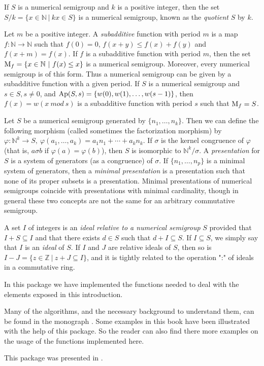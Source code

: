 \documentclass[a4paper,11pt]{report}
\begin{document}
{ If $S$ is a numerical semigroup and $k$ is a positive integer, then the set $S/k=\{ x\in {\mathbb N} \ |\ kx\in S\}$ is a numerical semigroup, known as the \emph{quotient} $S$ by $k$. 

 Let $m$ be a positive integer. A \label{llab2}\emph{subadditive} function with period $m$ is a map $f:{\mathbb N}\to {\mathbb N}$ such that $ f(0)=0$, $f(x+y)\leq f(x)+f(y)$ and $f(x+m)=f(x)$. If $f$ is a subadditive function with period $m$, then the set ${\rm M}_f=\{ x\in {\mathbb N}\ |\ f(x)\leq x\}$ is a numerical semigroup. Moreover, every numerical semigroup is of this form.
Thus a numerical semigroup can be given by a subadditive function with a given
period. If $S$ is a numerical semigroup and $s\in S, s\not=0$, and ${\rm Ap}(S,s)=\{ w(0),w(1),\ldots, w(s-1)\}$, then $f(x)=w(x \ mod\ s)$ is a subadditive function with period $s$ such that ${\rm M}_f=S$. 

 Let $S$ be a numerical semigroup generated by $\{n_1,\ldots,n_k\}$. Then we can define the following morphism (called sometimes the
factorization morphism) by $\varphi: {\mathbb N}^k \to S,\ \varphi(a_1,\ldots,a_k)=a_1n_1+\cdots+a_kn_k$. If $\sigma$ is the kernel congruence of $\varphi$ (that is, $a\sigma b$ if $\varphi(a)=\varphi(b)$), then $S$ is isomorphic to ${\mathbb N}^k/\sigma$. A \emph{presentation} for $S$ is a system of generators (as a congruence) of $\sigma$. If $\{n_1,\ldots,n_p\}$ is a minimal system of generators, then a \emph{minimal presentation} is a presentation such that none of its proper subsets is a presentation.
Minimal presentations of numerical semigroups coincide with presentations with
minimal cardinality, though in general these two concepts are not the same for
an arbitrary commutative semigroup. 

 A set $I$ of integers is an \emph{ideal relative to a numerical semigroup} $S$ provided that $I+S\subseteq I$ and that there exists $d\in S$ such that $d+I\subseteq S$. If $I\subseteq S$, we simply say that $I$ is an \emph{ideal} of $S$. If $I$ and $J$ are relative ideals of $S$, then so is $I-J=\{z\in {\mathbb Z}\ |\ z+J\subseteq I\}$, and it is tightly related to the operation ":" of ideals in a commutative
ring. 

 In this package we have implemented the functions needed to deal with the
elements exposed in this introduction. 

 Many of the algorithms, and the necessary background to understand them, can
be found in the monograph \cite{RGbook}. Some examples in this book have been illustrated with the help of this
package. So the reader can also find there more examples on the usage of the
functions implemented here. 

 This package was presented in \cite{JMDA}. }
\end{document}
